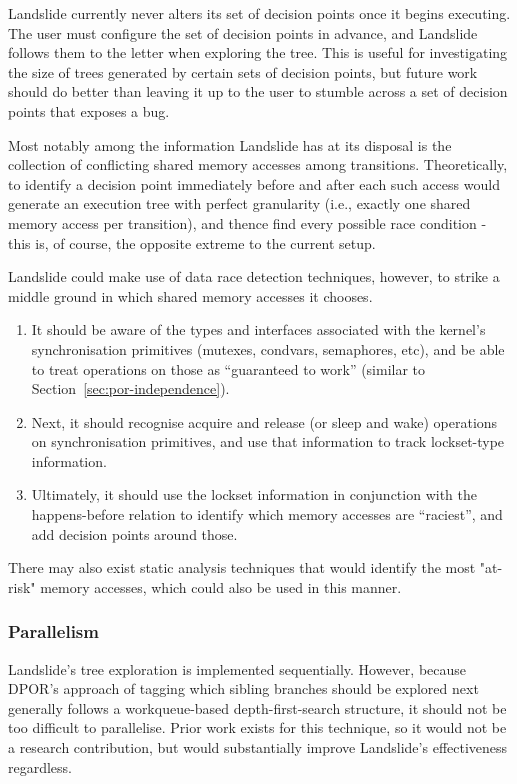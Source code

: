 Landslide currently never alters its set of decision points once it begins executing. The user must configure the set of decision points in advance, and Landslide follows them to the letter when exploring the tree. This is useful for investigating the size of trees generated by certain sets of decision points, but future work should do better than leaving it up to the user to stumble across a set of decision points that exposes a bug.

Most notably among the information Landslide has at its disposal is the collection of conflicting shared memory accesses among transitions. Theoretically, to identify a decision point immediately before and after each such access would generate an execution tree with perfect granularity (i.e., exactly one shared memory access per transition), and thence find every possible race condition - this is, of course, the opposite extreme to the current setup.

Landslide could make use of data race detection techniques\cite{datacollider}, however, to strike a middle ground in which shared memory accesses it chooses.
\begin{enumerate}
	\item It should be aware of the types and interfaces associated with the kernel's synchronisation primitives (mutexes, condvars, semaphores, etc), and be able to treat operations on those as ``guaranteed to work'' (similar to Section~\ref{sec:por-independence}).
	\item Next, it should recognise acquire and release (or sleep and wake) operations on synchronisation primitives, and use that information to track lockset-type information.
	\item Ultimately, it should use the lockset information in conjunction with the happens-before relation to identify which memory accesses are ``raciest'', and add decision points around those.
\end{enumerate}

There may also exist static analysis techniques that would identify the most "at-risk" memory accesses, which could also be used in this manner.

\subsubsection{Parallelism}

Landslide's tree exploration is implemented sequentially. However, because DPOR's approach of tagging which sibling branches should be explored next generally follows a workqueue-based depth-first-search structure, it should not be too difficult to parallelise. Prior work exists for this technique\cite{distributed-dpor}, so it would not be a research contribution, but would substantially improve Landslide's effectiveness regardless.

